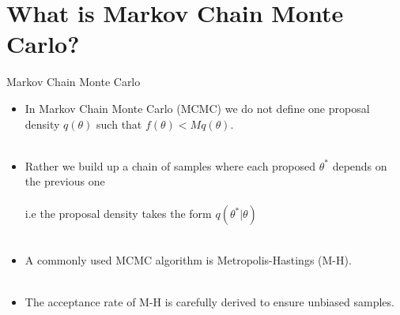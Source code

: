 \documentclass[compress]{beamer}
\begin{document}
\section{What is Markov Chain Monte Carlo?}
\label{sec-7}
\begin{frame}[label=sec-7-1]{Markov Chain Monte Carlo}
    \begin{itemize}
        \item In Markov Chain Monte Carlo (MCMC) we do not define one proposal density $q(\theta)$ such that $ f(\theta) < M q(\theta)$.\\~\\
        \item Rather we build up a \alert{chain} of samples where each proposed $\theta^*$ depends on the previous one \\~\\
        i.e the proposal density takes the form $q(\theta^* | \theta)$\\~\\
        \item A commonly used MCMC algorithm is \alert{Metropolis-Hastings} (M-H).\\~\\
        \item The acceptance rate of M-H is carefully derived to ensure \alert{unbiased samples}.
    \end{itemize}
\end{frame}
\end{document}

